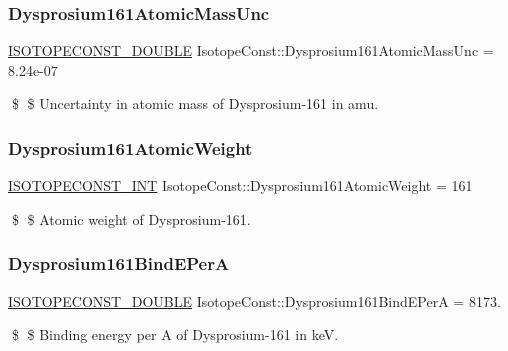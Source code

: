 \subsubsection{\texorpdfstring{Dysprosium161\+Atomic\+Mass\+Unc}{Dysprosium161AtomicMassUnc}}
{\footnotesize\ttfamily \mbox{\hyperlink{group___isotope_const-_macros_ga8f45a7272ce02c0b4c65c44636ed719a}{I\+S\+O\+T\+O\+P\+E\+C\+O\+N\+S\+T\+\_\+\+D\+O\+U\+B\+LE}} Isotope\+Const\+::\+Dysprosium161\+Atomic\+Mass\+Unc = 8.\+24e-\/07}

\$ \$ Uncertainty in atomic mass of Dysprosium-\/161 in amu. \mbox{\label{group___isotope_const-_dysprosium-_dy161_ga46ca97bd5e364f7cf7914289d8aa2cb4}} 
\subsubsection{\texorpdfstring{Dysprosium161\+Atomic\+Weight}{Dysprosium161AtomicWeight}}
{\footnotesize\ttfamily \mbox{\hyperlink{group___isotope_const-_macros_ga5f18360b3e99483a35c32d789e62621c}{I\+S\+O\+T\+O\+P\+E\+C\+O\+N\+S\+T\+\_\+\+I\+NT}} Isotope\+Const\+::\+Dysprosium161\+Atomic\+Weight = 161}

\$ \$ Atomic weight of Dysprosium-\/161. \mbox{\label{group___isotope_const-_dysprosium-_dy161_gae8da4c2af9c60931bc4dd173eeb5f838}} 
\subsubsection{\texorpdfstring{Dysprosium161\+Bind\+E\+PerA}{Dysprosium161BindEPerA}}
{\footnotesize\ttfamily \mbox{\hyperlink{group___isotope_const-_macros_ga8f45a7272ce02c0b4c65c44636ed719a}{I\+S\+O\+T\+O\+P\+E\+C\+O\+N\+S\+T\+\_\+\+D\+O\+U\+B\+LE}} Isotope\+Const\+::\+Dysprosium161\+Bind\+E\+PerA = 8173.}

\$ \$ Binding energy per A of Dysprosium-\/161 in keV. \mbox{\label{group___isotope_const-_dysprosium-_dy161_ga1046bc86c2ba6c3a70797149318f6d0a}} 

